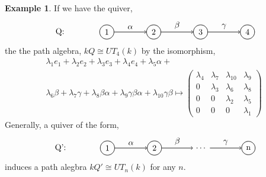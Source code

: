 \documentclass[11.5pt, twoside, a4paper, titlepage]{report}
\theoremstyle{definition}
\newtheorem{eg}[mydef]{Example}
\theoremstyle{plain}
\begin{document}
\begin{eg} \label{UTpathalgebraeg}
If we have the quiver,
\begin{equation*}
\begin{tikzpicture}[->,-latex, auto, every path/.style={->, semithick}, main node/.style={draw, circle}]
\node []			(0) at (-2,0)		{Q:};
\node	[main node]		(1) at (0,0)		{1};
\node [main node]		(2) at (2,0)		{2};
\node [main node]		(3) at (4,0)		{3};
\node [main node]		(4) at (6,0)		{4};

\draw (1) edge node [auto] {$\alpha$} (2);
\draw (2) edge node [auto] {$\beta$} (3);
\draw (3) edge node [auto] {$\gamma$} (4);
\end{tikzpicture}
\end{equation*}
the the path algebra, $kQ \cong UT_4(k)$ by the isomorphism,
\begin{multline*}
\lambda_1e_1+\lambda_2e_2+\lambda_3e_3+\lambda_4e_4+\lambda_5\alpha+\\
\lambda_6\beta+\lambda_7\gamma+\lambda_8\beta\alpha+\lambda_9\gamma\beta\alpha+\lambda_{10}\gamma\beta
\mapsto
\begin{pmatrix*}
\lambda_4 & \lambda_7 & \lambda_{10} & \lambda_9 \\
0 & \lambda_3 & \lambda_6 & \lambda_{8}\\
0 & 0 & \lambda_2 & \lambda_5 \\
0 & 0 & 0 & \lambda_1
\end{pmatrix*}
\end{multline*}
Generally, a quiver of the form,
\begin{equation*}
\begin{tikzpicture}[->,-latex, auto, every path/.style={->, semithick}, main node/.style={draw, circle}]
\node []		(0) at (-2,0)		{Q':};
\node	[main node]		(1) at (0,0)		{1};
\node [main node]		(2) at (2,0)		{2};
\node []			(3) at (4,0)		{$\dots$};
\node [main node]		(4) at (6,0)		{n};

\draw (1) edge node [auto] {$\alpha$} (2);
\draw (2) edge node [auto] {$\beta$} (3);
\draw (3) edge node [auto] {$\gamma$} (4);
\end{tikzpicture}
\end{equation*}
induces a path alegbra $kQ' \cong UT_n(k)$ for any $n$.
\end{eg}
\end{document}
